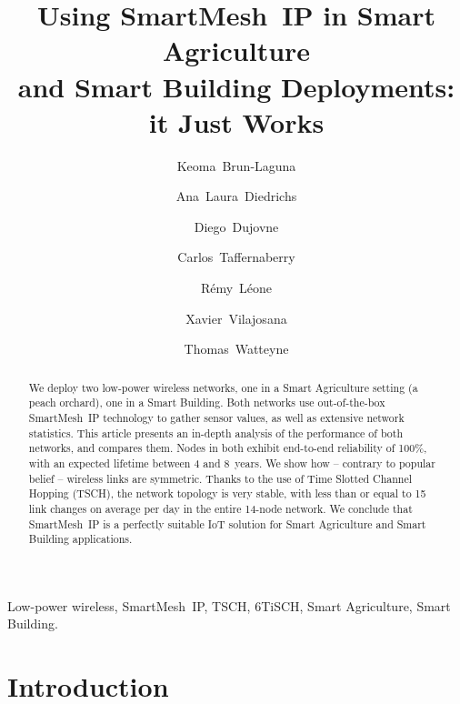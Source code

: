 \documentclass{elsarticle}
\newcommand{\smip}                {SmartMesh~IP\xspace}
\newcommand{\building}            {Smart Building\xspace}
\newcommand{\agri}                {Smart Agriculture\xspace}
\begin{document}
\begin{frontmatter}

\date{}

\title{Using \smip in \agri \\ and \building Deployments: it Just Works}

\author[inria]{Keoma~Brun-Laguna}
\author[utn,conicet]{Ana~Laura~Diedrichs}
\author[udp]{Diego~Dujovne}
\author[utn]{Carlos~Taffernaberry}
\author[inria]{R\'emy~L\'eone}
\author[uoc]{Xavier~Vilajosana}
\author[inria]{Thomas~Watteyne}

\address[inria]{~Inria, EVA team, Paris, France}
\address[utn]{~Universidad Tecnol\'ogica Nacional (UTN), Mendoza, Argentina}
\address[udp]{~Universidad Diego Portales, Santiago, Chile}
\address[uoc]{~Universitat Oberta de Catalunya, Barcelona, Catalonia, Spain}
\address[conicet]{~CONICET, Mendoza, Argentina}

\begin{abstract}
We deploy two low-power wireless networks, one in a \agri setting (a peach orchard), one in a \building.
Both networks use out-of-the-box \smip technology to gather sensor values, as well as extensive network statistics.
This article presents an in-depth analysis of the performance of both networks, and compares them.
Nodes in both exhibit end-to-end reliability of 100\%, with an expected lifetime between 4 and 8~years.
We show how -- contrary to popular belief -- wireless links are symmetric.
Thanks to the use of Time Slotted Channel Hopping (TSCH), the network topology is very stable, with less than or equal to 15 link changes on average per day in the entire 14-node network.
We conclude that \smip is a perfectly suitable IoT solution for \agri and \building applications.
\end{abstract}

\begin{keyword}
Low-power wireless, \smip, TSCH, 6TiSCH, \agri, \building.
\end{keyword}

\end{frontmatter}

\section{Introduction}
\label{sec:intro}
\end{document}
